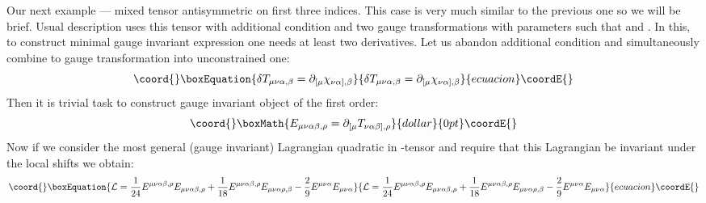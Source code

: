 \documentclass[a4paper,12pt]{article}
\begin{document}
Our next example --- mixed tensor \coordHE{}
antisymmetric on first three indices. This case is very much similar
to the previous one so we will be brief. Usual description uses this
tensor with additional condition \coordHE{} and
two gauge transformations with parameters \myHighlight{$\chi_{[\mu\nu],\alpha}$}\coordHE{}
such that \coordHE{} and \myHighlight{$\eta_{[\mu\nu\alpha]}$}\coordHE{}. In
this, to construct minimal gauge invariant expression one needs at
least two derivatives. Let us abandon additional condition
\coordHE{} and simultaneously combine to gauge
transformation into unconstrained one:
\begin{equation}\coord{}\boxEquation{
\delta T_{\mu\nu\alpha,\beta} = \partial_{[\mu}
\chi_{\nu\alpha],\beta}
}{
\delta T_{\mu\nu\alpha,\beta} = \partial_{[\mu}
\chi_{\nu\alpha],\beta}
}{ecuacion}\coordE{}\end{equation}
Then it is trivial task to construct gauge invariant object of the
first order:
$$\coord{}\boxMath{
E_{\mu\nu\alpha\beta,\rho} = \partial_{[\mu} T_{\nu\alpha\beta],\rho}
}{dollar}{0pt}\coordE{}$$
Now if we consider the most general (gauge invariant) Lagrangian
quadratic in \coordHE{}-tensor and require that this Lagrangian be invariant
under the local shifts
\coordHE{}
we obtain:
\begin{equation}\coord{}\boxEquation{
{\cal L} = \frac{1}{24} E^{\mu\nu\alpha\beta,\rho}
E_{\mu\nu\alpha\beta,\rho} + \frac{1}{18} E^{\mu\nu\alpha\beta,\rho}
E_{\mu\nu\alpha\rho,\beta} - \frac{2}{9} E^{\mu\nu\alpha}
E_{\mu\nu\alpha}
}{
{\cal L} = \frac{1}{24} E^{\mu\nu\alpha\beta,\rho}
E_{\mu\nu\alpha\beta,\rho} + \frac{1}{18} E^{\mu\nu\alpha\beta,\rho}
E_{\mu\nu\alpha\rho,\beta} - \frac{2}{9} E^{\mu\nu\alpha}
E_{\mu\nu\alpha}
}{ecuacion}\coordE{}\end{equation}
\end{document}
